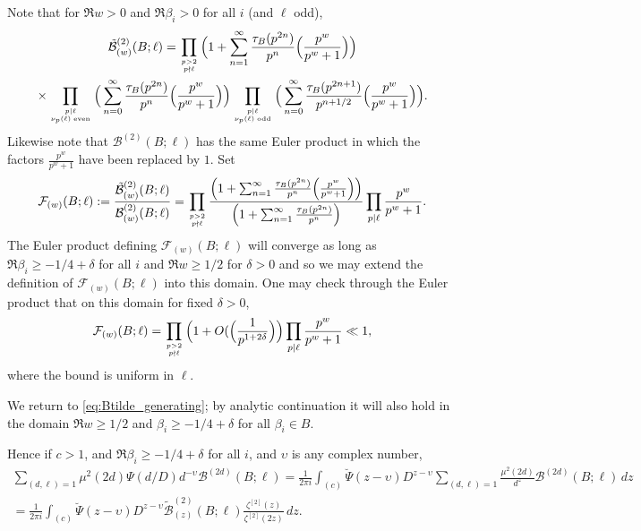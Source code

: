 \documentclass[12pt]{amsart}
\begin{document}
	Note that for $\Re w > 0$ and $\Re \beta_i > 0$ for all $i$ (and $\ell$ odd),
	\begin{multline*}
		\tilde{\mathcal{B}}_{(w)}^{(2)}(B;\ell) = \prod_{p > 2 \atop p \nmid \ell} \Big( 1+ \sum_{n=1}^\infty \frac{\tau_B(p^{2n})}{p^n} \Big(\frac{p^w}{p^w+1}\Big) \Big) \\
		\times 
		\prod_{p | \ell \atop \nu_p(\ell)\; \mathrm{even}} \Big( \sum_{n=0}^\infty \frac{\tau_B(p^{2n})}{p^n} \Big(\frac{p^w}{p^w+1}\Big) \Big) \prod_{p|\ell \atop \nu_p(\ell)\; \mathrm{odd}} \Big( \sum_{n=0}^\infty \frac{\tau_B(p^{2n+1})}{p^{n+1/2}} \Big(\frac{p^w}{p^w+1}\Big)\Big).
	\end{multline*}
	Likewise note that $\mathcal{B}^{(2)}(B;\ell)$ has the same Euler product in which the factors $\frac{p^w}{p^w+1}$ have been replaced by $1$. Set
	\begin{equation}
		\label{eq:F_def}
		\mathcal{F}_{(w)}(B;\ell) := \frac{\tilde{\mathcal{B}}_{(w)}^{(2)}(B;\ell)}{\mathcal{B}_{(w)}^{(2)}(B;\ell)} = \prod_{p > 2 \atop p \nmid \ell} \frac{\Big( 1+ \sum_{n=1}^\infty \frac{\tau_B(p^{2n})}{p^n} \Big(\frac{p^w}{p^w+1}\Big) \Big)}{\Big( 1+ \sum_{n=1}^\infty \frac{\tau_B(p^{2n})}{p^n} \Big)} \prod_{p | \ell} \frac{p^w}{p^w+1}.
	\end{equation}
	The Euler product defining $\mathcal{F}_{(w)}(B;\ell)$ will converge as long as $\Re \beta_i \geq -1/4+\delta$ for all $i$ and $\Re w \geq 1/2$ for $\delta > 0$ and so we may extend the definition of $\mathcal{F}_{(w)}(B;\ell)$ into this domain. One may check through the Euler product that on this domain for fixed $\delta > 0$,
	\begin{equation}
		\label{eq:F_bound}
		\mathcal{F}_{(w)}(B;\ell) = \prod_{p > 2 \atop p \nmid \ell} \Big( 1 + O(\Big( \frac{1}{p^{1+2\delta}}\Big) \Big) \prod_{p | \ell} \frac{p^w}{p^w+1} \ll 1,
	\end{equation}
	where the bound is uniform in $\ell$.
	
	We return to \eqref{eq:Btilde_generating}; by analytic continuation it will also hold in the domain $\Re w \geq 1/2$ and $\beta_i \geq -1/4+\delta$ for all $\beta_i \in B$.
	
	Hence if $c> 1$, and $\Re \beta_i \geq -1/4+\delta$ for all $i$, and $\upsilon$ is any complex number,
	\begin{multline}
		\label{eq:d_average_to_contour}
		\sum_{(d,\ell)=1} \mu^2(2d) \Psi(d/D) d^{-\upsilon}  \mathcal{B}^{(2d)}(B;\ell) = \frac{1}{2\pi i} \int_{(c)} \breve{\Psi}(z-\upsilon) D^{z-\upsilon} \sum_{(d,\ell)=1} \frac{\mu^2(2d)}{d^z} \mathcal{B}^{(2d)}(B;\ell)\, dz \\
		= \frac{1}{2\pi i} \int_{(c)} \breve{\Psi}(z-\upsilon) D^{z-\upsilon}  \tilde{\mathcal{B}}^{(2)}_{(z)}(B;\ell) \frac{\zeta^{[2]}(z)}{\zeta^{[2]}(2z)}\, dz.
	\end{multline}
	
\end{document}
